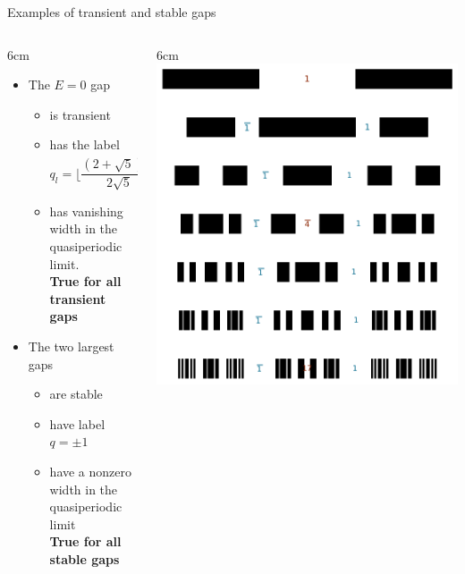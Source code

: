 \documentclass[xcolor=x11names,compress,professionalfonts]{beamer}
\renewcommand{\(}{\begin{columns}}
\renewcommand{\)}{\end{columns}}
\newcommand{\<}[1]{\begin{column}{#1}}
\renewcommand{\>}{\end{column}}
\begin{document}
\begin{frame}{Examples of transient and stable gaps}

\(
\<{6cm}
\begin{itemize}
	\item The $E=0$ gap 
	\begin{itemize}
		\item is transient
		\item has the label \[q_l = \Big\lfloor \frac{(2+\sqrt{5})^{l/3}}{2 \sqrt{5}} + \frac{1}{2} \Big\rfloor\]
		\item has  vanishing width in the quasiperiodic limit. \\
					\textbf{True for all transient gaps}
	\end{itemize}
	\item The two largest gaps 
	\begin{itemize}
		\item are stable
		\item have label $q = \pm 1$
		\item have a nonzero width in the quasiperiodic limit\\
					\textbf{True for all stable gaps}
	\end{itemize}
\end{itemize}
\>

\<{6cm}
\centering
\includegraphics[scale=.45]{img/main_gap_labels.pdf}
\>
\)

\end{frame}
\end{document}
